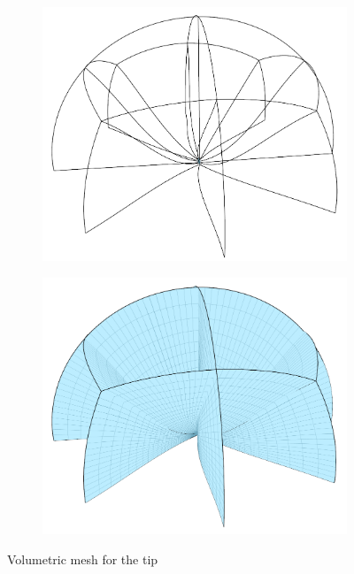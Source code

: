 \documentclass{nordic}
\begin{document}
\begin{figure}[h!]
  \centering
  \begin{subfigure}[b]{0.40\textwidth}
    \includegraphics[width=\textwidth]{figs/wingtip-lines}
  \end{subfigure}
  \begin{subfigure}[b]{0.40\textwidth}
    \includegraphics[width=\textwidth]{figs/wingtip-flower}
  \end{subfigure}
  \caption{Volumetric mesh for the tip}
  \label{fig:tfi:tip}
\end{figure}
\end{document}
